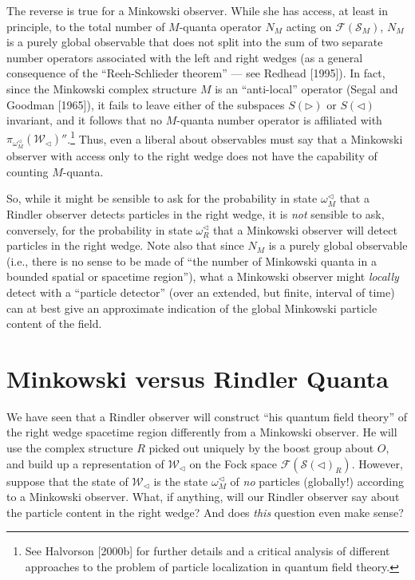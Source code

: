 \documentclass[12pt]{article}
\theoremstyle{remark}
\theoremstyle{definition}
\newcommand{\alg}[1]{\mathcal{#1}}
\newcommand{\hil}[1]{\mathcal{#1}}
\begin{document}
The reverse is true for a Minkowski observer.  While she has access,
at least in principle, to the total number of $M$-quanta operator
$N_{M}$ acting on $\hil{F}(\hil{S}_{M})$, $N_{M}$ is a purely global
observable that does not split into the sum of two separate number
operators associated with the left and right wedges (as a general
consequence of the ``Reeh-Schlieder theorem'' --- see Redhead [1995]).
In fact, since the Minkowski complex structure $M$ is an
``anti-local'' operator (Segal and Goodman [1965]), it fails to leave
either of the subspaces $S(\triangleright)$ or $S(\triangleleft)$
invariant, and it follows that no $M$-quanta number operator is
affiliated with $\pi_{\omega
  _{M}^{\triangleleft}}(\alg{W}_{\triangleleft})''$.\footnote{See
  Halvorson [2000b] for further details and a critical analysis of
  different approaches to the problem of particle localization in
  quantum field theory.}  Thus, even a liberal about observables must
say that a Minkowski observer with access only to the right wedge does
not have the capability of counting $M$-quanta.   

So, while it might be sensible to ask for the probability in state 
$\omega_{M}^{\triangleleft}$ that a 
Rindler observer detects particles in the right wedge, 
it is \emph{not} sensible to ask, conversely, for the probability in state 
$\omega_{R}^{\triangleleft}$ that a Minkowski observer will detect 
particles in the right wedge.  Note also that since $N_{M}$ is a purely 
global observable (i.e., there is no sense to be made of ``the number of 
Minkowski quanta in a bounded spatial or spacetime region''),
what a Minkowski observer 
might \emph{locally} detect with a ``particle detector'' (over an 
extended, but finite, interval of time) can at best 
give an approximate indication of the global Minkowski particle content of 
the field.  

\section{Minkowski versus Rindler Quanta}

We have seen that a Rindler observer will construct ``his quantum
field theory'' of the right wedge spacetime region differently from a
Minkowski observer.  He will use the complex structure $R$ picked out
uniquely by the boost group about $O$, and build up a representation
of $\alg{W}_{\triangleleft}$ on the Fock space
$\hil{F}(\hil{S}(\triangleleft)_{R})$.  However, suppose that the
state of $\alg{W}_{\triangleleft}$ is the state
$\omega_{M}^{\triangleleft}$ of \emph{no} particles (globally!)
according to a Minkowski observer.  What, if anything, will our
Rindler observer say about the particle content in the right wedge?
And does \emph{this} question even make sense?
  
\end{document}
